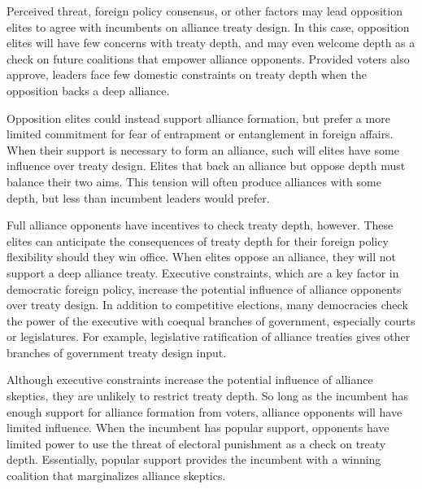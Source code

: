 \documentclass[12pt]{article}
\begin{document}
Perceived threat, foreign policy consensus, or other factors may lead opposition elites to agree with incumbents on alliance treaty design. 
In this case, opposition elites will have few concerns with treaty depth, and may even welcome depth as a check on future coalitions that empower alliance opponents. 
Provided voters also approve, leaders face few domestic constraints on treaty depth when the opposition backs a deep alliance. 

Opposition elites could instead support alliance formation, but prefer a more limited commitment for fear of entrapment or entanglement in foreign affairs. 
When their support is necessary to form an alliance, such will elites have some influence over treaty design.
Elites that back an alliance but oppose depth must balance their two aims.
This tension will often produce alliances with some depth, but less than incumbent leaders would prefer.  


Full alliance opponents have incentives to check treaty depth, however.
These elites can anticipate the consequences of treaty depth for their foreign policy flexibility should they win office.
When elites oppose an alliance, they will not support a deep alliance treaty.  
Executive constraints, which are a key factor in democratic foreign policy, increase the potential influence of alliance opponents over treaty design.   
In addition to competitive elections, many democracies check the power of the executive with coequal branches of government, especially courts or legislatures.
For example, legislative ratification of alliance treaties gives other branches of government treaty design input. 


Although executive constraints increase the potential influence of alliance skeptics, they are unlikely to restrict treaty depth. 
So long as the incumbent has enough support for alliance formation from voters, alliance opponents will have limited influence. 
When the incumbent has popular support, opponents have limited power to use the threat of electoral punishment as a check on treaty depth. 
Essentially, popular support provides the incumbent with a winning coalition that marginalizes alliance skeptics. 


\end{document}

